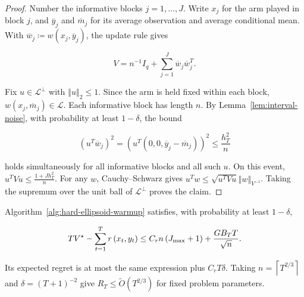 {{\begin{lemma}
\end{lemma}


\begin{proof}
Number the informative blocks $j = 1 , \ldots , J$. Write $x_{j}$ for
the arm played in block $j$, and ${\overline{y}}_{j}$ and ${\overline{m}}_{j}$
for its average observation and average conditional mean. With
${\overline{w}}_{j} \coloneqq w \left( x_{j} , {\overline{y}}_{j} \right)$, the update rule gives


\begin{equation*}
V = n^{- 1} I_{q} + \sum_{j = 1}^{J} {\overline{w}}_{j} {\overline{w}}_{j}^{T} .
\end{equation*}


Fix $u \in {\mathcal{L}}^{\perp}$ with ${\left\Vert u \right\Vert}_{2} \le 1$. Since the arm is held
fixed within each block, $w \left( x_{j} , {\overline{m}}_{j} \right) \in \mathcal{L}$. Each
informative block has length $n$. By Lemma~\ref{lem:interval-noise}, with
probability at least $1 - \delta$, the bound


\begin{equation*}
{\left( u^{T} {\overline{w}}_{j} \right)}^{2} = {\left( u^{T} \left( 0 , 0 , {\overline{y}}_{j} - {\overline{m}}_{j} \right) \right)}^{2} \le \frac{h_{T}^{2}}{n}
\end{equation*}


holds simultaneously for all informative blocks and all such $u$.
On this event, $u^{T} V u \le \frac{1 + J h_{T}^{2}}{n}$. For any $w$,
Cauchy--Schwarz gives $u^{T} w \le \sqrt{u^{T} V u} {\left\Vert w \right\Vert}_{V^{- 1}}$.
Taking the supremum over the unit ball of ${\mathcal{L}}^{\perp}$ proves the
claim.
\end{proof}


\begin{theorem}\label{thm:hard-ellipsoid-regret}

  Algorithm~\ref{alg:hard-ellipsoid-warmup} satisfies, with probability at least $1 - \delta$,


\begin{equation*}
T V^{\star} - \sum_{t = 1}^{T} r \left( x_{t} , y_{t} \right) \le C_{r} n \left( J_{\text{\normalfont max}} + 1 \right) + \frac{G B_{T} T}{\sqrt{n}} .
\end{equation*}


  Its expected regret is at most the same expression plus
  $C_{r} T \delta$. Taking $n = \left\lceil T^{2/3} \right\rceil$ and
  $\delta = {\left( T + 1 \right)}^{- 2}$ give $R_{T} \le \tilde{O} \left( T^{2/3} \right)$ for fixed problem
  parameters.


\end{theorem}}}
